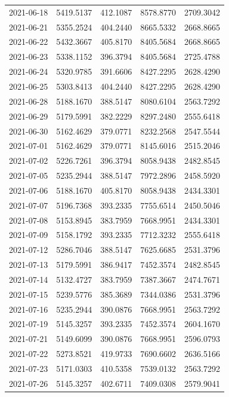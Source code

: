 \begin{footnotesize}
\begin{longtable}{lllll}
2021-06-18 & 5419.5137 & 412.1087 & 8578.8770 & 2709.3042 \\
2021-06-21 & 5355.2524 & 404.2440 & 8665.5332 & 2668.8665 \\
2021-06-22 & 5432.3667 & 405.8170 & 8405.5684 & 2668.8665 \\
2021-06-23 & 5338.1152 & 396.3794 & 8405.5684 & 2725.4788 \\
2021-06-24 & 5320.9785 & 391.6606 & 8427.2295 & 2628.4290 \\
2021-06-25 & 5303.8413 & 404.2440 & 8427.2295 & 2628.4290 \\
2021-06-28 & 5188.1670 & 388.5147 & 8080.6104 & 2563.7292 \\
2021-06-29 & 5179.5991 & 382.2229 & 8297.2480 & 2555.6418 \\
2021-06-30 & 5162.4629 & 379.0771 & 8232.2568 & 2547.5544 \\
2021-07-01 & 5162.4629 & 379.0771 & 8145.6016 & 2515.2046 \\
2021-07-02 & 5226.7261 & 396.3794 & 8058.9438 & 2482.8545 \\
2021-07-05 & 5235.2944 & 388.5147 & 7972.2896 & 2458.5920 \\
2021-07-06 & 5188.1670 & 405.8170 & 8058.9438 & 2434.3301 \\
2021-07-07 & 5196.7368 & 393.2335 & 7755.6514 & 2450.5046 \\
2021-07-08 & 5153.8945 & 383.7959 & 7668.9951 & 2434.3301 \\
2021-07-09 & 5158.1792 & 393.2335 & 7712.3232 & 2555.6418 \\
2021-07-12 & 5286.7046 & 388.5147 & 7625.6685 & 2531.3796 \\
2021-07-13 & 5179.5991 & 386.9417 & 7452.3574 & 2482.8545 \\
2021-07-14 & 5132.4727 & 383.7959 & 7387.3667 & 2474.7671 \\
2021-07-15 & 5239.5776 & 385.3689 & 7344.0386 & 2531.3796 \\
2021-07-16 & 5235.2944 & 390.0876 & 7668.9951 & 2563.7292 \\
2021-07-19 & 5145.3257 & 393.2335 & 7452.3574 & 2604.1670 \\
2021-07-21 & 5149.6099 & 390.0876 & 7668.9951 & 2596.0793 \\
2021-07-22 & 5273.8521 & 419.9733 & 7690.6602 & 2636.5166 \\
2021-07-23 & 5171.0303 & 410.5358 & 7539.0132 & 2563.7292 \\
2021-07-26 & 5145.3257 & 402.6711 & 7409.0308 & 2579.9041 \\

\end{longtable}
\end{footnotesize}
